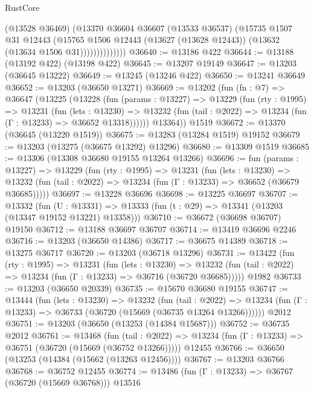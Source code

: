 \begin{lexlean}{RustCore}
\begin{coremodule}
                      (@13528 @36469)
                      (@13370
                        @36604
                        @36607
                        (@13533 @36537)
                        (@15735
                          @1507
                          @31
                          @12443
                          (@15765
                            @1506
                            @12443
                            (@13627 (@13628 @12443))
                            (@13632 (@13634 @1506 @31))))))))))))))
@36640 := @13186 @422
@36644 := @13188 (@13192 @422) (@13198 @422)
@36645 := @13207 @19149
@36647 := @13203 (@36645 @13222)
@36649 := @13245 (@13246 @422)
@36650 := @13241 @36649
@36652 := @13203 (@36650 @13271)
@36669 := @13202
    (fun (fn : @7) =>
    @36647
      (@13225
        (@13228
          (fun (params : @13227) =>
          @13229
            (fun (rty : @1995) =>
            @13231
              (fun (lets : @13230) =>
              @13232 (fun (tail : @2022) => @13234 (fun (Γ : @13233) => @36652 @13318))))))
        @13364))
    @1519
@36672 := @13370 (@36645 (@13220 @1519))
@36675 := @13283 (@13284 @1519) @19152
@36679 := @13203 (@13275 (@36675 @13292) @13296)
@36680 := @13309 @1519
@36685 := @13306 (@13308 @36680 @19155 @13264 @13266)
@36696 := fun (params : @13227) =>
  @13229
    (fun (rty : @1995) =>
    @13231
      (fun (lets : @13230) =>
      @13232 (fun (tail : @2022) => @13234 (fun (Γ : @13233) => @36652 (@36679 @36685)))))
@36697 := @13228 @36696
@36698 := @13225 @36697
@36707 := @13332
    (fun (U : @13331) => @13333 (fun (t : @29) => @13341 (@13203 (@13347 @19152 @13221) @13358)))
@36710 := @36672 (@36698 @36707) @19150
@36712 := @13188 @36697 @36707
@36714 := @13419 @36696 @2246
@36716 := @13203 (@36650 @14386)
@36717 := @36675 @14389
@36718 := @13275 @36717
@36720 := @13203 (@36718 @13296)
@36731 := @13422
    (fun (rty : @1995) =>
    @13231
      (fun (lets : @13230) =>
      @13232 (fun (tail : @2022) => @13234 (fun (Γ : @13233) => @36716 (@36720 @36685)))))
    @1982
@36733 := @13203 (@36650 @20339)
@36735 := @15670 @36680 @19155
@36747 := @13444
    (fun (lets : @13230) =>
    @13232
      (fun (tail : @2022) =>
      @13234 (fun (Γ : @13233) => @36733 (@36720 (@15669 (@36735 @13264 @13266))))))
    @2012
@36751 := @13203 (@36650 (@13253 (@14384 @15687)))
@36752 := @36735 @2012
@36761 := @13468
    (fun (tail : @2022) => @13234 (fun (Γ : @13233) => @36751 (@36720 (@15669 (@36752 @13266)))))
    @12455
@36766 := @36650 (@13253 (@14384 (@15662 (@13263 @12456))))
@36767 := @13203 @36766
@36768 := @36752 @12455
@36774 := @13486 (fun (Γ : @13233) => @36767 (@36720 (@15669 @36768))) @13516

\end{coremodule}
\end{lexlean}
